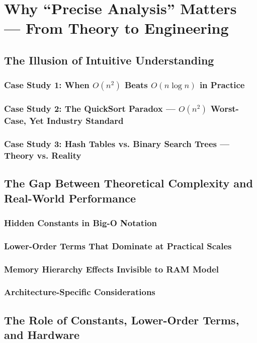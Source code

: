 \chapter{Why ``Precise Analysis'' Matters — From Theory to Engineering}

\section{The Illusion of Intuitive Understanding}
\subsection{Case Study 1: When $O(n^2)$ Beats $O(n \log n)$ in Practice}
\subsection{Case Study 2: The QuickSort Paradox — $O(n^2)$ Worst-Case, Yet Industry Standard}
\subsection{Case Study 3: Hash Tables vs. Binary Search Trees — Theory vs. Reality}

\section{The Gap Between Theoretical Complexity and Real-World Performance}
\subsection{Hidden Constants in Big-O Notation}
\subsection{Lower-Order Terms That Dominate at Practical Scales}
\subsection{Memory Hierarchy Effects Invisible to RAM Model}
\subsection{Architecture-Specific Considerations}

\section{The Role of Constants, Lower-Order Terms, and Hardware}
